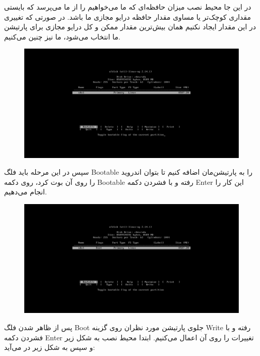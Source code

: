 \documentclass{article}
\begin{document}
در این جا محیط نصب میزان حافظه‌ای که ما می‌خواهیم را از ما می‌پرسد که بایستی مقداری کوچک‌تر یا مساوی مقدار حافظه درایو مجازی ما باشد. در صورتی که تغییری در این مقدار ایجاد نکنیم همان بیش‌ترین مقدار ممکن و کل درایو مجازی برای پارتیشن ما انتخاب می‌شود، ما نیز چنین می‌کنیم.

\begin{figure}[ht]
	\centering	
	\includegraphics[width = 1\textwidth]{images/install6.png}
\end{figure}

سپس در این مرحله باید فلگ Bootable را به پارتیشن‌مان اضافه کنیم تا بتوان اندروید را روی آن بوت کرد، روی دکمه Bootable رفته و با فشردن دکمه Enter این کار را انجام می‌دهیم.

\newpage

\begin{figure}[ht]
	\centering	
	\includegraphics[width = 1\textwidth]{images/install7.png}
\end{figure}

پس از ظاهر شدن فلگ Boot جلوی پارتیشن مورد نظران روی گزینه Write رفته و با فشردن دکمه Enter تغییرات را روی آن اعمال می‌کنیم. ابتدا محیط نصب به شکل زیر و سپس به شکل زیر در می‌آید:
\end{document}

